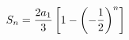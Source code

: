 \documentclass[preview]{standalone}
\begin{document}
\begin{align*}
\special{dvisvgm:raw <g id='unique000'>}S_n=\frac{2a_1}{3}\left[1-\left(-\frac{1}{2}\right)^n\right]\special{dvisvgm:raw </g>}
\end{align*}
\end{document}
